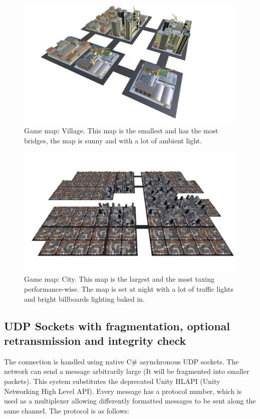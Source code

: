 \documentclass[12pt]{article}
\begin{document}
\begin{figure}[H]
\includegraphics[width=\textwidth]{map_village}
\caption{Game map: Village. This map is the smallest and has the most bridges, the map is sunny and with a lot of ambient light.}
\end{figure}

\begin{figure}[H]
\includegraphics[width=\textwidth]{map_city}
\caption{Game map: City. This map is the largest and the most taxing performance-wise. The map is set at night with a lot of traffic lights and bright billboards lighting baked in.}
\end{figure}

\clearpage

\subsection{UDP Sockets with fragmentation, optional retransmission and integrity check}
The connection is handled using native C\# asynchronous UDP sockets. The network can send a message arbitrarily large (It will be fragmented into smaller packets). This system substitutes the deprecated Unity HLAPI (Unity Networking High Level API). Every message has a protocol number, which is used as a multiplexer allowing differently formatted messages to be sent along the same channel. The protocol is as follows:
\end{document}
